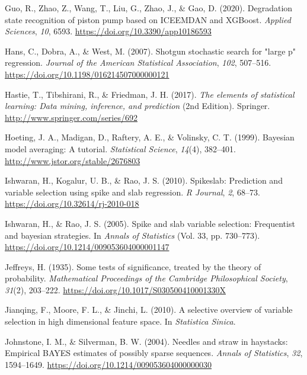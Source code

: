 \documentclass[
  11pt,
]{article}
\newlength{\cslhangindent}
\newlength{\cslentryspacingunit} %
\newenvironment{CSLReferences}[2] %
 {%
  \setlength{\parindent}{0pt}
  \ifodd #1
  \let\oldpar\par
  \def\par{\hangindent=\cslhangindent\oldpar}
  \fi
  \setlength{\parskip}{#2\cslentryspacingunit}
 }%
 {}
\begin{document}
\begin{CSLReferences}{1}{0}
\leavevmode{}%
Guo, R., Zhao, Z., Wang, T., Liu, G., Zhao, J., \& Gao, D. (2020).
Degradation state recognition of piston pump based on ICEEMDAN and
XGBoost. \emph{Applied Sciences}, \emph{10}, 6593.
\url{https://doi.org/10.3390/app10186593}

\leavevmode{}%
Hans, C., Dobra, A., \& West, M. (2007). Shotgun stochastic search for
"large p" regression. \emph{Journal of the American Statistical
Association}, \emph{102}, 507--516.
\url{https://doi.org/10.1198/016214507000000121}

\leavevmode{}%
Hastie, T., Tibshirani, R., \& Friedman, J. H. (2017). \emph{The
elements of statistical learning: Data mining, inference, and
prediction} (2nd Edition). Springer.
\url{http://www.springer.com/series/692}

\leavevmode{}%
Hoeting, J. A., Madigan, D., Raftery, A. E., \& Volinsky, C. T. (1999).
Bayesian model averaging: A tutorial. \emph{Statistical Science},
\emph{14}(4), 382--401. \url{http://www.jstor.org/stable/2676803}

\leavevmode{}%
Ishwaran, H., Kogalur, U. B., \& Rao, J. S. (2010). Spikeslab:
Prediction and variable selection using spike and slab regression.
\emph{R Journal}, \emph{2}, 68--73.
\url{https://doi.org/10.32614/rj-2010-018}

\leavevmode{}%
Ishwaran, H., \& Rao, J. S. (2005). Spike and slab variable selection:
Frequentist and bayesian strategies. In \emph{Annals of Statistics}
(Vol. 33, pp. 730--773).
\url{https://doi.org/10.1214/009053604000001147}

\leavevmode{}%
Jeffreys, H. (1935). Some tests of significance, treated by the theory
of probability. \emph{Mathematical Proceedings of the Cambridge
Philosophical Society}, \emph{31}(2), 203--222.
\url{https://doi.org/10.1017/S030500410001330X}

\leavevmode{}%
Jianqing, F., Moore, F. L., \& Jinchi, L. (2010). A selective overview
of variable selection in high dimensional feature space. In
\emph{Statistica Sinica}.

\leavevmode{}%
Johnstone, I. M., \& Silverman, B. W. (2004). Needles and straw in
haystacks: Empirical BAYES estimates of possibly sparse sequences.
\emph{Annals of Statistics}, \emph{32}, 1594--1649.
\url{https://doi.org/10.1214/009053604000000030}


\end{CSLReferences}
\end{document}
